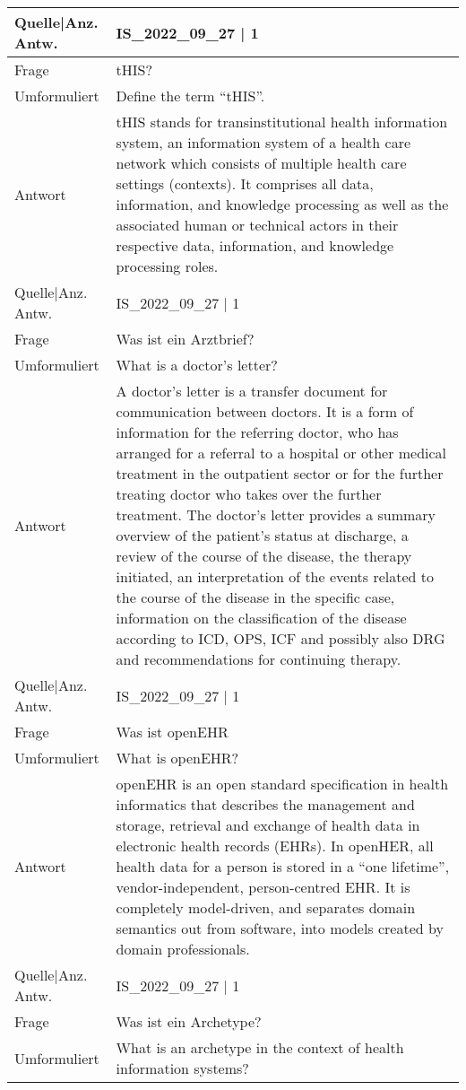 {\begin{landscape}
\begin{longtable}{p{3cm}p{}}
    Quelle|Anz. Antw. & IS\_2022\_09\_27 | 1 \\
    \midrule
    Frage & tHIS? \\
    Umformuliert & Define the term ``tHIS''. \\
    Antwort & tHIS stands for transinstitutional health information system, an information system of a health care network which consists of multiple health care settings (contexts). It comprises all data, information, and knowledge processing as well as the associated human or technical actors in their respective data, information, and knowledge processing roles.\\
    Quelle|Anz. Antw. & IS\_2022\_09\_27 | 1 \\
    \midrule
    Frage & Was ist ein Arztbrief? \\
    Umformuliert & What is a doctor's letter? \\
    Antwort & A doctor's letter is a transfer document for communication between doctors.
    It is a form of information for the referring doctor, who has arranged for a referral to a hospital or other medical treatment in the outpatient sector or for the further treating doctor who takes over the further treatment.
    The doctor's letter provides a summary overview of the patient's status at discharge, a review of the course of the disease, the therapy initiated, an interpretation of the events related to the course of the disease in the specific case, information on the classification of the disease according to ICD, OPS, ICF and possibly also DRG and recommendations for continuing therapy.\\
    Quelle|Anz. Antw. & IS\_2022\_09\_27 | 1 \\
    \midrule
    Frage & Was ist openEHR \\
    Umformuliert & What is openEHR? \\
    Antwort & openEHR is an open standard specification in health informatics that describes the management and storage, retrieval and exchange of health data in electronic health records (EHRs). In openHER, all health data for a person is stored in a ``one lifetime'', vendor-independent, person-centred EHR.
    It is completely model-driven, and separates domain semantics out from software, into models created by domain professionals.\\
    Quelle|Anz. Antw. & IS\_2022\_09\_27 | 1 \\
    \midrule
    Frage & Was ist ein Archetype? \\
    Umformuliert & What is an archetype in the context of health information systems? \\

\end{longtable}
\end{landscape}}
